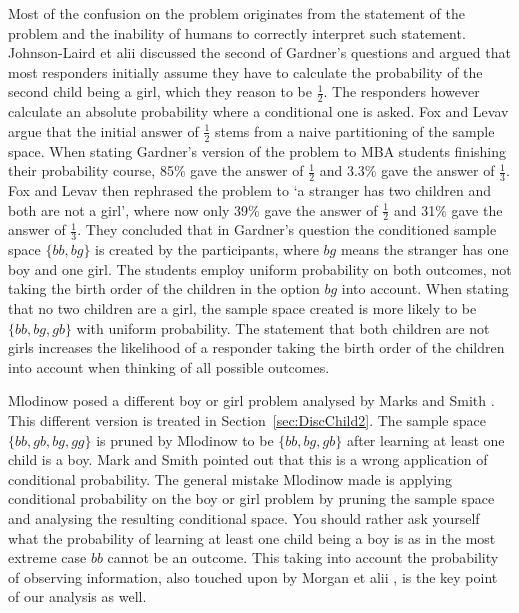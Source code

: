 \documentclass[a4paper]{report}
\theoremstyle{plain}
\theoremstyle{definition}
\theoremstyle{remark}
\numberwithin{equation}{chapter}
\DeclareMathOperator{\1}{\mathbbm{1}}
\begin{document}
Most of the confusion on the problem originates from the statement of the problem and the inability of humans to correctly interpret such statement. Johnson-Laird et alii \cite{Laird99} discussed the second of Gardner's questions and argued that most responders initially assume they have to calculate the probability of the second child being a girl, which they reason to be $\frac{1}{2}$. The responders however calculate an absolute probability where a conditional one is asked. Fox and Levav \cite{Fox04} argue that the initial answer of $\frac{1}{2}$ stems from a naive partitioning of the sample space. When stating Gardner's version of the problem to MBA students finishing their probability course, 85\% gave the answer of $\frac{1}{2}$ and 3.3\% gave the answer of $\frac{1}{3}$. Fox and Levav then rephrased the problem to `a stranger has two children and both are not a girl', where now only 39\% gave the answer of $\frac{1}{2}$ and 31\% gave the answer of $\frac{1}{3}$. They concluded that in Gardner's question the conditioned sample space $\{bb,bg\}$ is created by the participants, where $bg$ means the stranger has one boy and one girl. The students employ uniform probability on both outcomes, not taking the birth order of the children in the option $bg$ into account. When stating that no two children are a girl, the sample space created is more likely to be $\{bb,bg,gb\}$ with uniform probability. The statement that both children are not girls increases the likelihood of a responder taking the birth order of the children into account when thinking of all possible outcomes.

Mlodinow \cite{Mlodinow09} posed a different boy or girl problem analysed by Marks and Smith \cite{Marks11}. This different version is treated in Section~\ref{sec:DiscChild2}. The sample space $\{bb,gb,bg,gg\}$ is pruned by Mlodinow to be $\{bb,bg,gb\}$ after learning at least one child is a boy. Mark and Smith pointed out that this is a wrong application of conditional probability. The general mistake Mlodinow made is applying conditional probability on the boy or girl problem by pruning the sample space and analysing the resulting conditional space. You should rather ask yourself what the probability of learning at least one child being a boy is as in the most extreme case $bb$ cannot be an outcome. This taking into account the probability of observing information, also touched upon by Morgan et alii \cite{Morgan91a}, is the key point of our analysis as well.
\end{document}
